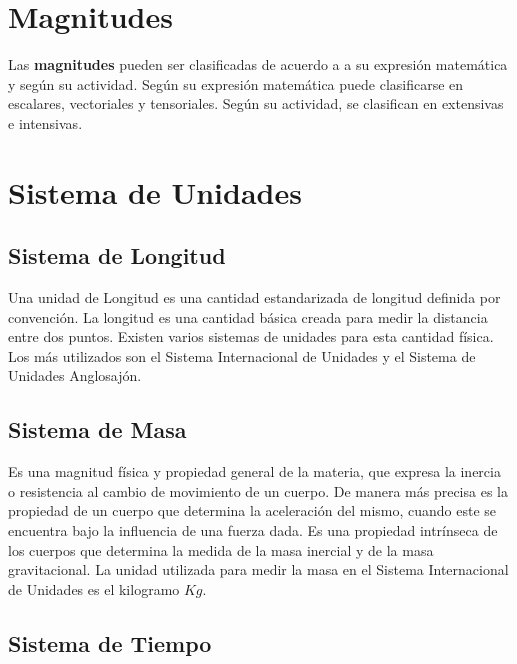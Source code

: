 \documentclass[11pt]{article}
\begin{document}


\section{Magnitudes}

Las \textbf{magnitudes} pueden ser clasificadas de acuerdo a a su expresión matemática y según su actividad. Según su expresión matemática puede clasificarse en escalares, vectoriales y tensoriales. Según su actividad, se clasifican en extensivas e intensivas.

\section{Sistema de Unidades}


\subsection{Sistema de Longitud}

Una unidad de Longitud\cite{longitud} es una cantidad estandarizada de longitud definida por convención. La longitud es una cantidad básica creada para medir la distancia entre dos puntos.  Existen varios sistemas de unidades para esta cantidad física. Los más utilizados son el Sistema Internacional de Unidades y el Sistema de Unidades Anglosajón.

\subsection{Sistema de Masa}

Es una magnitud física y propiedad general de la materia, que expresa la inercia o resistencia al cambio de movimiento de un cuerpo. De manera más precisa es la propiedad de un cuerpo que determina la aceleración del mismo, cuando este se encuentra bajo la influencia de una fuerza dada. Es una propiedad intrínseca de los cuerpos que determina la medida de la masa inercial y de la masa gravitacional. La unidad utilizada para medir la masa en el Sistema Internacional de Unidades es el kilogramo $Kg$.


\subsection{Sistema de Tiempo}
\end{document}
